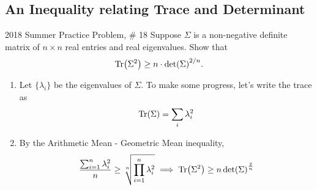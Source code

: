 \documentclass[../main]{subfiles}
\begin{document}
\subsection{An Inequality relating Trace and Determinant}
\begin{bbox}{{2018 Summer Practice Problem, \# 18}}
Suppose $\Sigma$ is a non-negative definite matrix of $n\times n$ real entries and real eigenvalues. Show that 
\[
\Tr(\Sigma^2) \geq n \cdot \det(\Sigma)^{2/n}.
\]
\end{bbox}
\begin{solution}
    \begin{enumerate}
        \item Let $\{\lambda_i\}$ be the eigenvalues of $\Sigma$. To make some progress, let's write the trace as 
        \[
        \Tr(\Sigma) = \sum_i \lambda_i^2        
        \]
        \item By the Arithmetic Mean - Geometric Mean inequality,
        \[
        \frac{\sum_{i=1}^n \lambda_i^2}{n} \geq \sqrt[n]{\prod_{i=1}^n \lambda_i^2} \implies \Tr(\Sigma^2) \geq n \det(\Sigma)^{\frac{2}{n}}
        \]
    \end{enumerate}
\end{solution}
\end{document}
